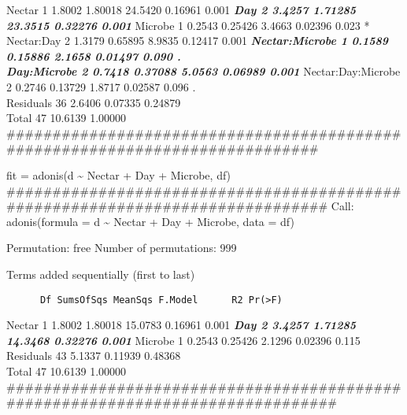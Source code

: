 \documentclass[]{article}
\begin{document}
Nectar 1 1.8002 1.80018 24.5420 0.16961 0.001 \textbf{\emph{ Day 2
3.4257 1.71285 23.3515 0.32276 0.001 }} Microbe 1 0.2543 0.25426 3.4663
0.02396 0.023 *\\
Nectar:Day 2 1.3179 0.65895 8.9835 0.12417 0.001 \textbf{\emph{
Nectar:Microbe 1 0.1589 0.15886 2.1658 0.01497 0.090 .\\
Day:Microbe 2 0.7418 0.37088 5.0563 0.06989 0.001 }} Nectar:Day:Microbe
2 0.2746 0.13729 1.8717 0.02587 0.096 .\\
Residuals 36 2.6406 0.07335 0.24879\\
Total 47 10.6139 1.00000\\
\#\#\#\#\#\#\#\#\#\#\#\#\#\#\#\#\#\#\#\#\#\#\#\#\#\#\#\#\#\#\#\#\#\#\#\#\#\#\#\#\#\#\#\#\#\#\#\#\#\#\#\#\#\#\#\#\#\#\#\#\#\#\#\#\#\#\#\#\#\#\#\#\#\#\#\#\#

fit = adonis(d \textasciitilde{} Nectar + Day + Microbe, df)
\#\#\#\#\#\#\#\#\#\#\#\#\#\#\#\#\#\#\#\#\#\#\#\#\#\#\#\#\#\#\#\#\#\#\#\#\#\#\#\#\#\#\#\#\#\#\#\#\#\#\#\#\#\#\#\#\#\#\#\#\#\#\#\#\#\#\#\#\#\#\#\#\#\#\#\#\#\#
Call: adonis(formula = d \textasciitilde{} Nectar + Day + Microbe, data
= df)

Permutation: free Number of permutations: 999

Terms added sequentially (first to last)

\begin{verbatim}
      Df SumsOfSqs MeanSqs F.Model      R2 Pr(>F)    
\end{verbatim}

Nectar 1 1.8002 1.80018 15.0783 0.16961 0.001 \textbf{\emph{ Day 2
3.4257 1.71285 14.3468 0.32276 0.001 }} Microbe 1 0.2543 0.25426 2.1296
0.02396 0.115\\
Residuals 43 5.1337 0.11939 0.48368\\
Total 47 10.6139 1.00000\\
\#\#\#\#\#\#\#\#\#\#\#\#\#\#\#\#\#\#\#\#\#\#\#\#\#\#\#\#\#\#\#\#\#\#\#\#\#\#\#\#\#\#\#\#\#\#\#\#\#\#\#\#\#\#\#\#\#\#\#\#\#\#\#\#\#\#\#\#\#\#\#\#\#\#\#\#\#\#\#

\subsubsection{}\label{section-13}

\subsection{}\label{section-14}

\section{}\label{section-15}
\end{document}
